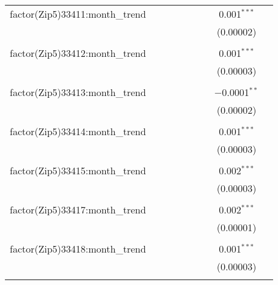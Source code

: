 \begin{table}[H]
{\begin{tabular}{@{\extracolsep{5pt}}lcccccccc}
  factor(Zip5)33411:month\_trend &  &  &  &  &  &  & 0.001$^{***}$ &  \\  

   &  &  &  &  &  &  & (0.00002) &  \\  

   & & & & & & & & \\  

  factor(Zip5)33412:month\_trend &  &  &  &  &  &  & 0.001$^{***}$ &  \\  

   &  &  &  &  &  &  & (0.00003) &  \\  

   & & & & & & & & \\  

  factor(Zip5)33413:month\_trend &  &  &  &  &  &  & $-$0.0001$^{**}$ &  \\  

   &  &  &  &  &  &  & (0.00002) &  \\  

   & & & & & & & & \\  

  factor(Zip5)33414:month\_trend &  &  &  &  &  &  & 0.001$^{***}$ &  \\  

   &  &  &  &  &  &  & (0.00003) &  \\  

   & & & & & & & & \\  

  factor(Zip5)33415:month\_trend &  &  &  &  &  &  & 0.002$^{***}$ &  \\  

   &  &  &  &  &  &  & (0.00003) &  \\  

   & & & & & & & & \\  

  factor(Zip5)33417:month\_trend &  &  &  &  &  &  & 0.002$^{***}$ &  \\  

   &  &  &  &  &  &  & (0.00001) &  \\  

   & & & & & & & & \\  

  factor(Zip5)33418:month\_trend &  &  &  &  &  &  & 0.001$^{***}$ &  \\  

   &  &  &  &  &  &  & (0.00003) &  \\  

   & & & & & & & & \\  


\end{tabular}}
\end{table}
